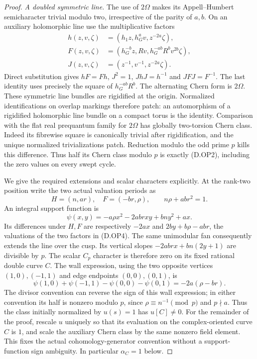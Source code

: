 \begin{proof}
\emph{A doubled symmetric line.}
The use of $2\Omega$ makes its Appell--Humbert semicharacter
trivial modulo two, irrespective of the parity of $a,b$.
On an auxiliary holomorphic line use the multiplicative factors
\[
\begin{aligned}
 h(z,v,\zeta)&=(h_1z,h_G^a v,z^{-2a}\zeta),\\
 F(z,v,\zeta)&=(h_G^{-b}z,Rv,
                         h_G^{-ab}R^b v^{2b}\zeta),\\
 J(z,v,\zeta)&=(z^{-1},v^{-1},z^{-2a}\zeta).
\end{aligned}                                                    \tag{D.OP4}
\]
Direct substitution gives $hF=Fh$, $J^2=1$, $JhJ=h^{-1}$
and $JFJ=F^{-1}$. The last identity uses precisely the square
of $h_G^{-ab}R^b$. The alternating Chern form is $2\Omega$.
These symmetric line bundles are rigidified at the origin.
Normalized identifications on overlap markings therefore patch:
an automorphism of a rigidified holomorphic line bundle on a
compact torus is the identity. Comparison with the flat real
prequantum family for $2\Omega$ has globally two-torsion Chern
class. Indeed its fibrewise square is canonically trivial after
rigidification, and the unique normalized trivializations patch.
Reduction modulo the odd prime $p$ kills this difference. Thus
half its Chern class modulo $p$ is exactly (D.OP2), including
the zero values on every swept cycle.

We give the required extensions and scalar characters explicitly.
At the rank-two position write the two actual valuation periods as
\[
 H=(n,ar),\quad F=(-br,\rho),\qquad n\rho+ab r^2=1.
\]
An integral support function is
\[
 \psi(x,y)=-a\rho x^2-2ab rxy+bn y^2+ax.
 \tag{D.OP5}
\]
Its differences under $H,F$ are respectively
$-2ax$ and $2by+b\rho-ab r$, the valuations of the
two factors in (D.OP4). The same unimodular fan consequently
extends the line over the cusp. Its vertical slopes
$-2ab rx+bn(2y+1)$ are divisible by $p$.
The scalar $C_p$ character is therefore zero on its fixed
rational double curve $C$. The wall expression, using the two
opposite vertices $(1,0),(-1,1)$ and edge endpoints
$(0,0),(0,1)$, is
\[
 \psi(1,0)+\psi(-1,1)-\psi(0,0)-\psi(0,1)
                         =-2a(\rho-br).
 \tag{D.OP6}
\]
The divisor convention can reverse the sign of this wall
expression; in either convention its half is nonzero modulo
$p$, since $\rho\equiv n^{-1}\pmod p$ and $p\nmid a$.
Thus the class initially normalized by $u(s)=1$ has
$u[C]\ne0$. For the remainder of the proof, rescale $u$
uniquely so that its evaluation on the complex-oriented
curve $C$ is $1$, and scale the auxiliary Chern class by
the same nonzero field element. This fixes the actual
cohomology-generator convention without a support-function
sign ambiguity. In particular $\alpha_C=1$ below.


\end{proof}
